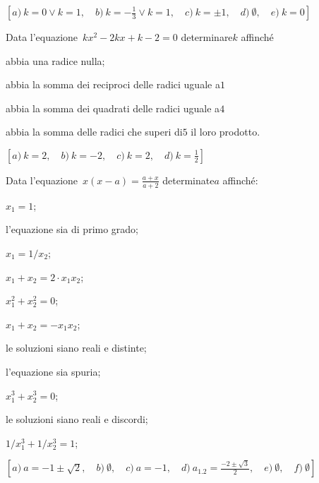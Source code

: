 \begin{flushright}
$\left[a)~ k = 0 \vee k = 1 ,\quad b)~ k =-\frac{1}{3} \vee k = 1 
,\quad c)~ k = \pm 1 ,\quad d)~ \emptyset ,\quad e)~ k=0 \right]$
\end{flushright}

\begin{esercizio}[\Ast]
 \label{ese:3.102}
Data l'equazione~$kx^{2}-2kx + k-2 = 0$ determinare$k$ affinché
\begin{enumeratea}
\item abbia una radice nulla;~
\item abbia la somma dei reciproci delle radici uguale a$1$
\item abbia la somma dei quadrati delle radici uguale a$4$
\item abbia la somma delle radici che superi di$5$ il loro prodotto.
\end{enumeratea}
\end{esercizio}

\begin{flushright}
$\left[a)~ k = 2 ,\quad b)~ k = -2 ,\quad c)~ k = 2 ,\quad 
d)~ k = \frac{1}{2} \right]$
\end{flushright}

\begin{esercizio}[\Ast]
 \label{ese:3.103}
Data l'equazione~$x (x-a) = \frac{a + x}{a + 2}$ determinate$a$ affinché:
\begin{multicols}{2}
\begin{enumeratea}
\item $x_1 = 1$;
\item l'equazione sia di primo grado;
\item $x_1 = 1 / x_2$;
\item $x_1 + x_2 = 2 \cdot x_1 x_2$;
\item $x_1^2 + x_2^2 = 0$;
\item $x_1 + x_2 = - x_1 x_2$;
\item le soluzioni siano reali e distinte;
\item l'equazione sia spuria;
\item $x_1^3 + x_2^3 = 0$;
\item le soluzioni siano reali e discordi;
\item $1/x_1^3 + 1/x_2^3 = 1$;
\end{enumeratea}
\end{multicols}
\end{esercizio}

\begin{flushright}
$\left[a)~ a =-1 \pm \sqrt{2} ,\quad b)~ \emptyset ,\quad c)~ a 
=-1 ,\quad d)~ a_{1.2} =\frac{- 2 \pm \sqrt{3}}{2} ,\quad e)~ \emptyset 
,\quad f)~ \emptyset \right]$
\end{flushright}

